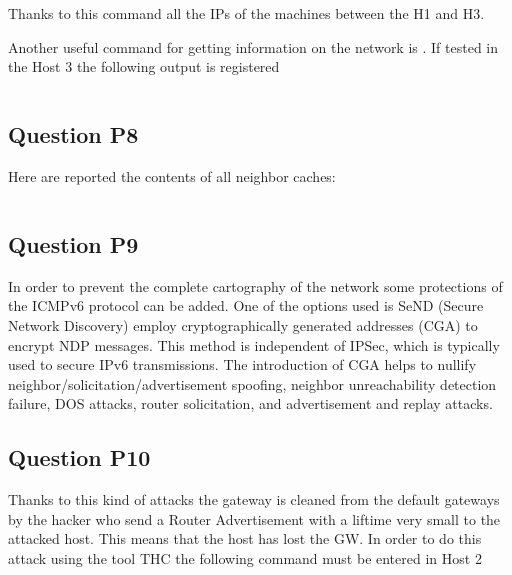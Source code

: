 \inputminted{text}{files/P7_traceroute.txt}
\label{conf:traceroute_H1_H3}

Thanks to this command all the IPs of the machines between the H1 and H3.

Another useful command for getting information on the network is . If tested in the Host 3 the following output is registered

\inputminted{text}{files/P7_netstat.txt}
\label{conf:netstat_H3}

\subsection{Question P8}
Here are reported the contents of all neighbor caches:
\inputminted{text}{files/P8_neighbor_chache.txt}
\label{log:neighbor_chache}

\subsection{Question P9}
In order to prevent the complete cartography of the network some protections of the ICMPv6 protocol can be added. One of the options used is SeND (Secure Network Discovery) employ cryptographically generated addresses (CGA) to encrypt NDP messages. This method is independent of IPSec, which is typically used to secure IPv6 transmissions. The introduction of CGA helps to nullify neighbor/solicitation/advertisement spoofing, neighbor unreachability detection failure, DOS attacks, router solicitation, and advertisement and replay attacks.

\subsection{Question P10}
Thanks to this kind of attacks the gateway is cleaned from the default gateways by the hacker who send a Router Advertisement with a liftime very small to the attacked host. This means that the host has lost the GW. In order to do this attack using the tool THC the following command must be entered in Host 2 

